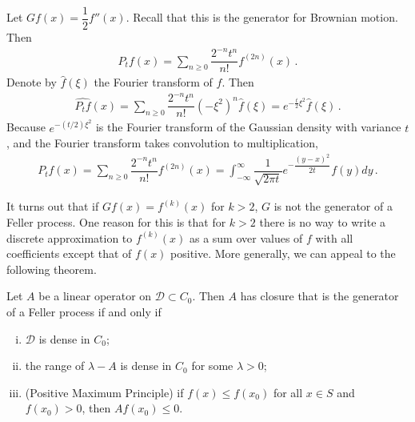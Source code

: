 \documentclass[../../../Master/AppliedStochastics.tex]{subfiles}
\begin{document}
\begin{example}
    Let $Gf(x) = \dfrac{1}{2} f''(x)$.
    Recall that this is the generator for Brownian motion. 
    Then 
    $$\begin{aligned}
        P_t f(x) = \sum_{n \geq 0} \dfrac{2^{-n} t^{n}}{n!} f^{(2n)}(x)\,.
    \end{aligned}$$
    Denote by $\widehat{f}(\xi)$ the Fourier transform of $f$.
    Then
    $$\begin{aligned}
        \widehat{P_t f}(x)
            = \sum_{n \geq 0} \dfrac{2^{-n}t^{n}}{n!}
                (-\xi^2)^{n} \hat{f}(\xi)
            = e^{-\frac{t}{2} \xi^2} \widehat{f}(\xi)\,.
    \end{aligned}$$
    Because $e^{-(t/2) \xi^2}$ is the Fourier transform of
        the Gaussian density with variance $t$,
        and the Fourier transform takes convolution to multiplication,
    $$\begin{aligned}
        P_t f(x) = \sum_{n \geq 0} \dfrac{2^{-n}t^{n}}{n!} f^{(2n)}(x) 
                 = \int_{-\infty}^{\infty} \dfrac{1}{\sqrt{ 2 \pi t }}
                    e^{-\dfrac{(y-x)^2}{2t}} f(y) dy\,.
    \end{aligned}$$
\end{example}


It turns out that if $Gf(x) = f^{(k)}(x)$ for $k > 2$,
    $G$ is not the generator of a Feller process.
One reason for this is that for $k > 2$ there is no way
    to write a discrete approximation to $f^{(k)}(x)$ as a sum
    over values of $f$ with all coefficients except that of $f(x)$ positive.
More generally, we can appeal to the following theorem.
\begin{theorem}
    Let $A$ be a linear operator on $\mathcal{D} \subset C_0$.
    Then $A$ has closure that is the generator of a Feller process
        if and only if
    \begin{enumerate}[(i)]
    \item
    $\mathcal{D}$ is dense in $C_0$;
    
    \item
    the range of $\lambda - A$ is dense in $C_0$ for some $\lambda > 0$;
    
    \item (Positive Maximum Principle)
    if $f(x) \leq f(x_0)$ for all $x \in S$ and $f(x_0) > 0$,
        then $A f(x_0) \leq 0$.
    \end{enumerate}
\end{theorem}
\end{document}
